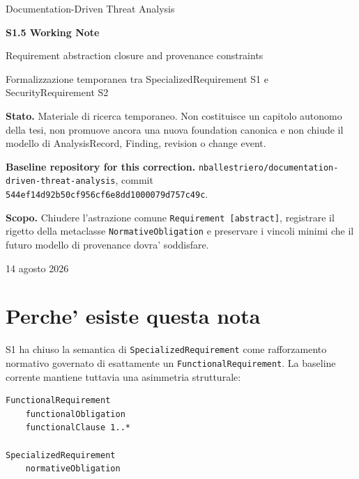 \documentclass[11pt,a4paper]{article}
\newcommand{\artifact}[1]{\nolinkurl{#1}}
\begin{document}

\begin{titlepage}
\centering
\vspace*{2.1cm}
{\Large Documentation-Driven Threat Analysis\par}
\vspace{0.8cm}
{\Huge\bfseries S1.5 Working Note\par}
\vspace{0.35cm}
{\LARGE Requirement abstraction closure and provenance constraints\par}
\vspace{1.0cm}
{\large Formalizzazione temporanea tra SpecializedRequirement S1 e SecurityRequirement S2\par}
\vfill
\begin{minipage}{0.84\textwidth}
\small
\textbf{Stato.} Materiale di ricerca temporaneo. Non costituisce un capitolo autonomo della tesi, non promuove ancora una nuova foundation canonica e non chiude il modello di AnalysisRecord, Finding, revision o change event.

\medskip
\textbf{Baseline repository for this correction.} \artifact{nballestriero/documentation-driven-threat-analysis}, commit \artifact{544ef14d92b50cf956cf6e8dd1000079d757c49c}.

\medskip
\textbf{Scopo.} Chiudere l'astrazione comune \texttt{Requirement [abstract]}, registrare il rigetto della metaclasse \texttt{NormativeObligation} e preservare i vincoli minimi che il futuro modello di provenance dovra' soddisfare.
\end{minipage}
\vfill
{\large 14 agosto 2026\par}
\end{titlepage}

\tableofcontents
\newpage
{}

\section{Perche' esiste questa nota}

S1 ha chiuso la semantica di \texttt{SpecializedRequirement} come rafforzamento normativo governato di esattamente un \texttt{FunctionalRequirement}. La baseline corrente mantiene tuttavia una asimmetria strutturale:

\begin{lstlisting}
FunctionalRequirement
    functionalObligation
    functionalClause 1..*

SpecializedRequirement
    normativeObligation
\end{lstlisting}
\end{document}

